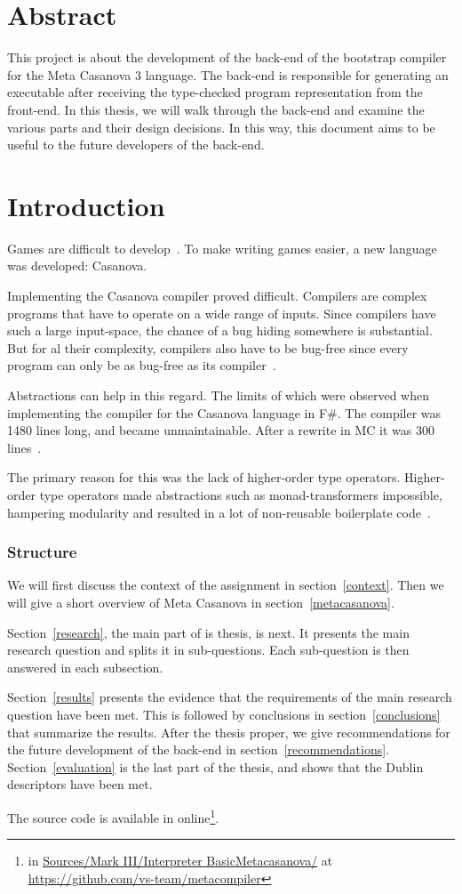 \section*{Abstract}
This project is about the development of the back-end of the bootstrap compiler for the Meta Casanova 3 language.
The back-end is responsible for generating an executable after receiving the type-checked program representation from the front-end.
In this thesis, we will walk through the back-end and examine the various parts and their design decisions.
In this way, this document aims to be useful to the future developers of the back-end.

\section{Introduction}
Games are difficult to develop~\cite{blow}.
To make writing games easier, a new language was developed: Casanova.

Implementing the Casanova compiler proved difficult.
Compilers are complex programs that have to operate on a wide range of inputs.
Since compilers have such a large input-space, the chance of a bug hiding somewhere is substantial. 
But for al their complexity, compilers also have to be bug-free since every program can only be as bug-free as its compiler~\cite{thompson}.

Abstractions can help in this regard.
The limits of which were observed when implementing the compiler for the Casanova language in F\#.
The compiler was 1480 lines long, and became unmaintainable.
After a rewrite in MC it was 300 lines~\cite{maggiore}.

The primary reason for this was the lack of higher-order type operators.
Higher-order type operators made abstractions such as monad-transformers impossible, hampering modularity and resulted in a lot of non-reusable boilerplate code~\cite{pierce}.

\subsubsection{Structure}
We will first discuss the context of the assignment in section~\ref{context}.
Then we will give a short overview of Meta Casanova in section~\ref{metacasanova}.

Section~\ref{research}, the main part of is thesis, is next.
It presents the main research question and splits it in sub-questions.
Each sub-question is then answered in each subsection.

Section~\ref{results} presents the evidence that the requirements of the main research question have been met.
This is followed by conclusions in section~\ref{conclusions} that summarize the results.
After the thesis proper, we give recommendations for the future development of the back-end in section~\ref{recommendations}.
Section~\ref{evaluation} is the last part of the thesis, and shows that the Dublin descriptors have been met.

{The source code is available in online\protect\footnote{in \url{Sources/Mark III/Interpreter BasicMetacasanova/} at \url{https://github.com/vs-team/metacompiler}}}.
